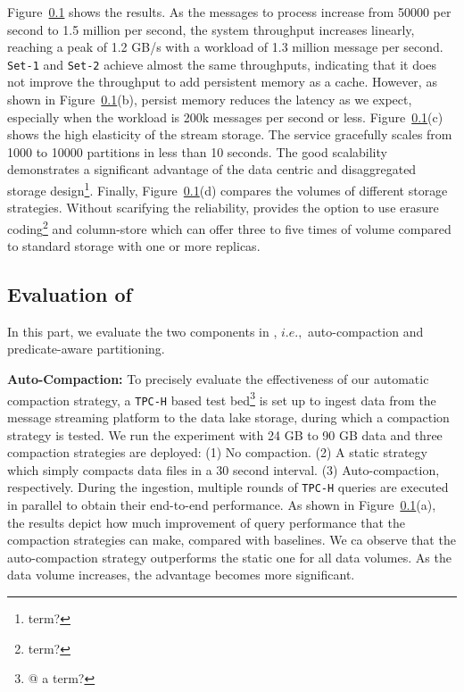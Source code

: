 Figure~\ref{} shows the results. As the messages to process increase from 50000 per second to 1.5 million per second, the system throughput increases linearly, reaching a peak of 1.2 GB/s with a workload of 1.3 million message per second. \texttt{Set-1} and \texttt{Set-2} achieve almost the same throughputs, indicating that it does not improve the throughput to add persistent memory as a cache. However, as shown in Figure~\ref{}(b), persist memory reduces the latency as we expect, especially when the workload is 200k messages per second or less. Figure~\ref{}(c) shows the high elasticity of the stream storage. The service gracefully scales from 1000 to 10000 partitions in less than 10 seconds. The good scalability  demonstrates a significant advantage of the data centric and disaggregated storage design\footnote{term?}.  Finally, Figure~\ref{}(d) compares the volumes of different storage strategies. Without scarifying the reliability, \sys provides the option to use erasure coding\footnote{term?} and column-store which can offer three to five times of volume compared to standard storage with one or more replicas. 









\subsection{Evaluation of \brain}

In this part, we evaluate the two components in \brain, $i.e.,$ auto-compaction and predicate-aware partitioning.

 
\noindent \textbf{Auto-Compaction:} To precisely evaluate the effectiveness of our automatic compaction strategy, a \texttt{TPC-H} based test bed\footnote{@ a term?} is set up to ingest data from the message streaming platform to the data lake storage, during which a compaction strategy is tested. We run the experiment with 24 GB to 90 GB data and three compaction strategies are deployed: (1) No compaction. (2) A static strategy which simply compacts data files in a 30 second interval. (3) Auto-compaction, respectively. 
During the ingestion, multiple rounds of \texttt{TPC-H} queries are executed in parallel  to obtain their end-to-end performance. As shown in Figure~\ref{}(a), the results depict how much improvement of  query performance that the compaction strategies can make, compared with baselines.
 We ca observe that the auto-compaction strategy outperforms the static one for all data volumes. As the data volume increases, the advantage becomes more significant. 


